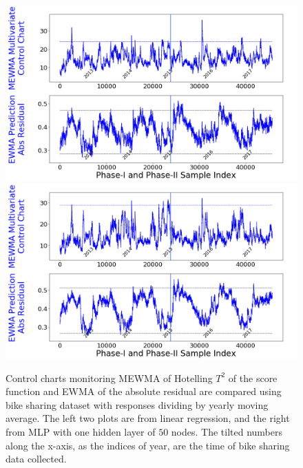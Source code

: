 \documentclass[twoside,11pt]{article}
\begin{document}
\begin{figure}[!htbp]
\centering
 \includegraphics[width = 0.49\linewidth, trim=0in 2.6in 0in 0in, clip]{../figures/v14/bike_sharing/reg_norm_scal_train/bike_reg_1e-08_0_0001_0_005_99_0.png}
  \includegraphics[width = 0.49\linewidth, trim=0in 2.6in 0in 0in, clip]{../figures/v14/bike_sharing/reg_norm_nnet_scal_train/bike_reg_0_1_0_0001_0_005_99_0.png}
  \caption{
Control charts monitoring MEWMA of Hotelling $T^2$ of the score function and EWMA of the absolute residual are compared using bike sharing dataset with responses dividing by yearly moving average. The left two plots are from linear regression, and the right from MLP with one hidden layer of $50$ nodes. The tilted numbers along the x-axis, as the indices of year, are the time of bike sharing data collected.
}
\label{fig:bike_sharing_preproc}
\end{figure}
\end{document}
